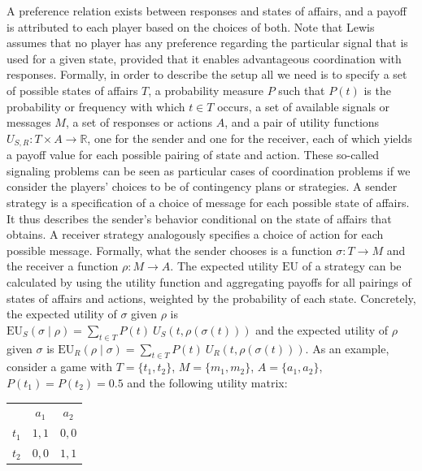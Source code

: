 \documentclass[a4paper]{article}
\begin{document}
A preference relation exists between responses and states of affairs, and a payoff is attributed to each player based on the choices of both.
Note that Lewis assumes that no player has any preference regarding the particular signal that is used for a given state, provided that it enables advantageous coordination with responses.
Formally, in order to describe the setup all we need is to specify a set of possible states of affairs $T$, a probability measure $P$ such that $P(t)$ is the probability or frequency with which $t \in T$ occurs, a set of available signals or messages $M$, a set of responses or actions $A$, and a pair of utility functions $U_{S,R} : T \times A \rightarrow \mathbb{R}$, one for the sender and one for the receiver, each of which yields a payoff value for each possible pairing of state and action.
These so-called signaling problems can be seen as particular cases of coordination problems if we consider the players' choices to be of contingency plans or strategies.
A sender strategy is a specification of a choice of message for each possible state of affairs.
It thus describes the sender's behavior conditional on the state of affairs that obtains.
A receiver strategy analogously specifies a choice of action for each possible message.
Formally, what the sender chooses is a function $\sigma : T \rightarrow M$ and the receiver a function $\rho : M \rightarrow A$.
The expected utility $\text{EU}$ of a strategy can be calculated by using the utility function and aggregating payoffs for all pairings of states of affairs and actions, weighted by the probability of each state.
Concretely, the expected utility of $\sigma$ given $\rho$ is $\text{EU}_S(\sigma \mid \rho) = \sum_{t \in T} P(t) \ U_S(t, \rho(\sigma(t)))$ and the expected utility of $\rho$ given $\sigma$ is $\text{EU}_R(\rho \mid \sigma) = \sum_{t \in T} P(t) \ U_R(t, \rho(\sigma(t)))$.
As an example, consider a game with $T = \lbrace t_1, t_2 \rbrace$, $M = \lbrace m_1, m_2 \rbrace$, $A = \lbrace a_1, a_2 \rbrace$, $P(t_1) = P(t_2) = 0.5$ and the following utility matrix:
\begin{center}
\begin{tabular}{r|c|c|}
\multicolumn{1}{r}{}
 & \multicolumn{1}{c}{$a_1$}
 & \multicolumn{1}{c}{$a_2$} \\ \cline{2-3}
   $t_1$ & $1,1$ & $0,0$ \\ \cline{2-3}
   $t_2$ & $0,0$ & $1,1$ \\ \cline{2-3}
\end{tabular}
\end{center}
\end{document}
